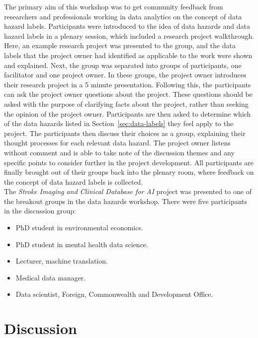 \documentclass{article}
\begin{document}
The primary aim of this workshop was to get community feedback from
researchers and professionals working in data analytics on the concept
of data hazard labels.
Participants were introduced to the idea of data hazards and data
hazard labels in a plenary session, which included a research project
walkthrough. Here, an example research project was presented to the
group, and the data labels that the project owner had identified as
applicable to the work were shown and explained.
Next, the group was separated into groups of participants, one
facilitator and one project owner.
In these groups, the project owner introduces their research project
in a 5 minute presentation. Following this, the participants can ask
the project owner questions about the project. These questions should
be asked with the purpose of clarifying facts about the project,
rather than seeking the opinion of the project owner.
Participants are then asked to determine which of the data hazards
listed in Section~\ref{sec:data-labels} they feel apply to the
project. The participants then discuss their choices as a group,
explaining their thought processes for each relevant data hazard.
The project owner listens without comment and is able to take note of
the discussion themes and any specific points to consider further in
the project development. All participants are finally brought out of
their groups back into the plenary room, where feedback on the concept
of data hazard labels is collected. \\

The \textit{Stroke Imaging and Clinical Database for AI} project was
presented to one of the breakout groups in the data hazards workshop.
There were five participants in the discussion group:

\begin{itemize}
\item PhD student in environmental economics.
\item PhD student in mental health data science.
\item Lecturer, machine translation.
\item Medical data manager.
\item Data scientist, Foreign, Commonwealth and Development Office.
\end{itemize}


\section{Discussion}
\end{document}
